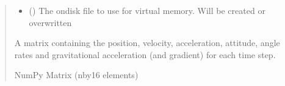 \documentclass[letterpaper,10pt,english]{sphinxmanual}
\begin{document}
\begin{fulllineitems}
\begin{quote}
\begin{description}
\begin{itemize}
\item {} 
\sphinxAtStartPar
{} () \textendash{} The on\sphinxhyphen{}disk file to use for virtual memory.
Will be created or overwritten

\end{itemize}

\sphinxAtStartPar
A matrix containing the position, velocity, acceleration,
attitude, angle rates and gravitational acceleration (and gradient)
for each time step.

\sphinxAtStartPar
NumPy Matrix (n\sphinxhyphen{}by\sphinxhyphen{}16 elements)

\end{description}\end{quote}

\end{fulllineitems}

\end{document}
